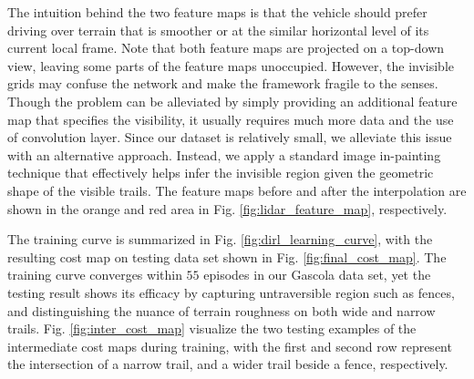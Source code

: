 \documentclass[../thesis.tex]{subfiles}
\begin{document}
 
The intuition behind the two feature maps is that the vehicle should prefer driving over terrain that is smoother or at the similar horizontal level of its current local frame.
Note that both feature maps are projected on a top-down view, leaving some parts of the feature maps unoccupied.
However, the invisible grids may confuse the network and make the framework fragile to the senses.
Though the problem can be alleviated by simply providing an additional feature map that specifies the visibility, it usually requires much more data and the use of convolution layer. \cite{wulfmeier2015maximum,wulfmeier2016watch}
Since our dataset is relatively small, we alleviate this issue with an alternative approach.
Instead, we apply a standard image in-painting technique \cite{telea2004image} that effectively helps infer the invisible region given the geometric shape of the visible trails.
The feature maps before and after the interpolation are shown in the orange and red area in Fig. \ref{fig:lidar_feature_map}, respectively.
 
The training curve is summarized in Fig. \ref{fig:dirl_learning_curve}, with the resulting cost map on testing data set shown in Fig. \ref{fig:final_cost_map}. 
The training curve converges within $55$ episodes in our Gascola data set, yet the testing result shows its efficacy by capturing untraversible region such as fences, and distinguishing the nuance of terrain roughness on both wide and narrow trails.
Fig. \ref{fig:inter_cost_map} visualize the two testing examples of the intermediate cost maps during training, with the first and second row represent the intersection of a narrow trail, and a wider trail beside a fence, respectively.
\end{document}
